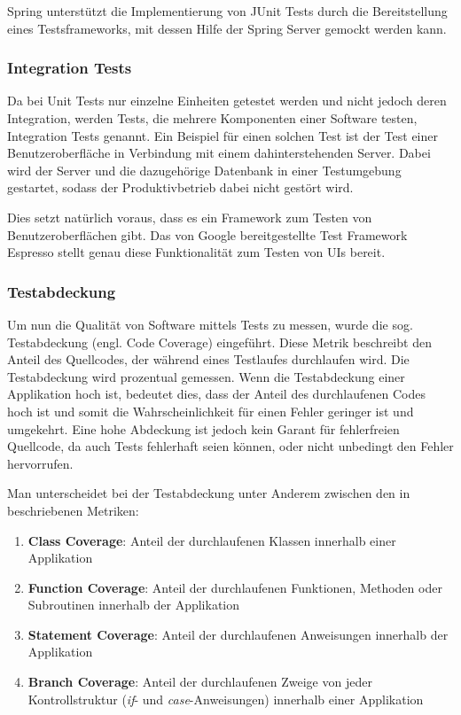 				Spring unterstützt die Implementierung von JUnit Tests durch die Bereitstellung eines Testsframeworks, mit dessen Hilfe der Spring Server gemockt werden kann. 
				
			\subsubsection{Integration Tests}
			\label{qm.integration_tests}
			
				Da bei Unit Tests nur einzelne Einheiten getestet werden und nicht jedoch deren Integration, werden Tests, die mehrere Komponenten einer Software testen, Integration Tests genannt. Ein Beispiel für einen solchen Test ist der Test einer Benutzeroberfläche in Verbindung mit einem dahinterstehenden Server. Dabei wird der Server und die dazugehörige Datenbank in einer Testumgebung gestartet, sodass der Produktivbetrieb dabei nicht gestört wird. 
				
				Dies setzt natürlich voraus, dass es ein Framework zum Testen von Benutzeroberflächen gibt. Das von Google bereitgestellte Test Framework Espresso stellt genau diese Funktionalität zum Testen von \acs{UI}s bereit. 
			
			\subsubsection{Testabdeckung}
			\label{qm.tests.testabdeckung}
			
				Um nun die Qualität von Software mittels Tests zu messen, wurde die sog. Testabdeckung (engl. Code Coverage) eingeführt. Diese Metrik beschreibt den Anteil des Quellcodes, der während eines Testlaufes durchlaufen wird. Die Testabdeckung wird prozentual gemessen. Wenn die Testabdeckung einer Applikation hoch ist, bedeutet dies, dass der Anteil des durchlaufenen Codes hoch ist und somit die Wahrscheinlichkeit für einen Fehler geringer ist und umgekehrt. Eine hohe Abdeckung ist jedoch kein Garant für fehlerfreien Quellcode, da auch Tests fehlerhaft seien können, oder nicht unbedingt den Fehler hervorrufen. \cite{MartinFowler.2292020b}
				
				Man unterscheidet bei der Testabdeckung unter Anderem zwischen den in \cite{Myers.2004} beschriebenen Metriken:
				
				\begin{enumerate}
					\item 
						\textbf{Class Coverage}: Anteil der durchlaufenen Klassen innerhalb einer Applikation
					\item 	
						\textbf{Function Coverage}: Anteil der durchlaufenen Funktionen, Methoden oder Subroutinen innerhalb der Applikation
					\item 
						\textbf{Statement Coverage}: Anteil der durchlaufenen Anweisungen innerhalb der Applikation
					\item 
						\textbf{Branch Coverage}: Anteil der durchlaufenen Zweige von jeder Kontrollstruktur (\textit{if}- und \textit{case}-Anweisungen) innerhalb einer Applikation 
				\end{enumerate}
			
